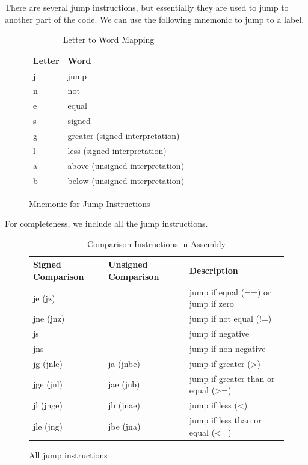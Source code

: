   \begin{definition}[Jump]
    There are several jump instructions, but essentially they are used to jump to another part of the code. We can use the following mnemonic to jump to a label. 

    \begin{figure}[H]
      \centering 
      \begin{table}[H]
        \centering
        \begin{tabular}{|l|l|}
        \hline
        \textbf{Letter} & \textbf{Word} \\ \hline
        j & jump \\ \hline
        n & not \\ \hline
        e & equal \\ \hline
        s & signed \\ \hline
        g & greater (signed interpretation) \\ \hline
        l & less (signed interpretation) \\ \hline
        a & above (unsigned interpretation) \\ \hline
        b & below (unsigned interpretation) \\ \hline
        \end{tabular}
        \caption{Letter to Word Mapping}
        \label{table:letter_word_mapping}
      \end{table}
      \caption{Mnemonic for Jump Instructions} 
      \label{fig:jump_instructions_mnemonic}
    \end{figure}

    For completeness, we include all the jump instructions. 
      
    \begin{figure}[H]
      \centering 
      \begin{table}[H]
        \centering
        \begin{tabular}{|l|l|l|}
        \hline
        \textbf{Signed Comparison} & \textbf{Unsigned Comparison} & \textbf{Description} \\ \hline
        je (jz) & & jump if equal (==) or jump if zero \\ \hline
        jne (jnz) & & jump if not equal (!=) \\ \hline
        js & & jump if negative \\ \hline
        jns & & jump if non-negative \\ \hline
        jg (jnle) & ja (jnbe) & jump if greater (>) \\ \hline
        jge (jnl) & jae (jnb) & jump if greater than or equal (>=) \\ \hline
        jl (jnge) & jb (jnae) & jump if less (<) \\ \hline
        jle (jng) & jbe (jna) & jump if less than or equal (<=) \\ \hline
        \end{tabular}
        \caption{Comparison Instructions in Assembly}
        \label{table:comparison_instructions}
      \end{table}
      \caption{All jump instructions} 
      \label{fig:jump_instructions_all}
    \end{figure}
  \end{definition}

